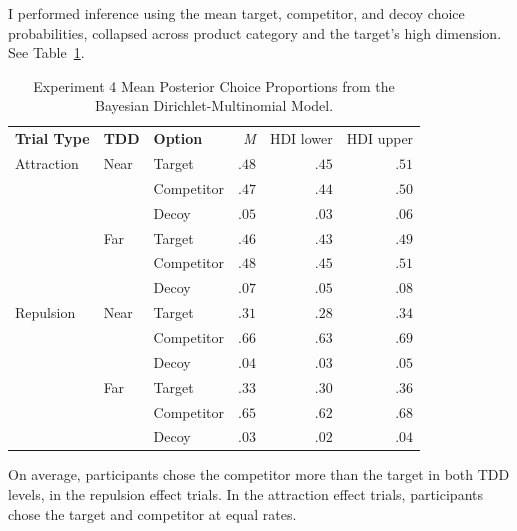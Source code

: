 I performed inference using the mean target, competitor, and decoy choice probabilities, collapsed across product category and the target's high dimension. See Table~\ref{tab:e4_choice_params}.

\begin{table}[ht]
    \centering
    \begin{tabular}{lllrrr}
        \toprule
        \textbf{Trial Type} & \textbf{TDD} & \textbf{Option} & \textit{M} & HDI lower & HDI upper \\
        Attraction          & Near         & Target          &  $.48$     & $.45$     & $.51$     \\
                            &              & Competitor      &  $.47$     & $.44$     & $.50$     \\
                            &              & Decoy           &  $.05$     & $.03$     & $.06$     \\
                            & Far          & Target          &  $.46$     & $.43$     & $.49$     \\
                            &              & Competitor      &  $.48$     & $.45$     & $.51$     \\
                            &              & Decoy           &  $.07$     & $.05$     & $.08$     \\
        Repulsion           & Near         & Target          &  $.31$     & $.28$     & $.34$     \\
                            &              & Competitor      &  $.66$     & $.63$     & $.69$     \\
                            &              & Decoy           &  $.04$     & $.03$     & $.05$     \\
                            & Far          & Target          &  $.33$     & $.30$     & $.36$     \\
                            &              & Competitor      &  $.65$     & $.62$     & $.68$     \\
                            &              & Decoy           &  $.03$     & $.02$     & $.04$     \\
    \end{tabular}
    \caption{Experiment 4 Mean Posterior Choice Proportions from the Bayesian Dirichlet-Multinomial Model.}
    \label{tab:e4_choice_params}
\end{table}

On average, participants chose the competitor more than the target in both TDD levels, in the repulsion effect trials. In the attraction effect trials, participants chose the target and competitor at equal rates. 

